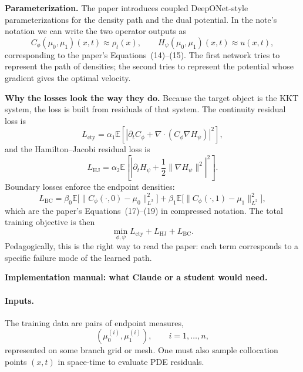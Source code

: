\documentclass[11pt]{report}
\newcommand{\E}{\mathbb{E}}
\begin{document}
\textbf{Parameterization.}
The paper introduces coupled DeepONet-style parameterizations for the density path
and the dual potential.  In the note's notation we can write the two operator
outputs as
\begin{equation}
C_\phi(\mu_0,\mu_1)(x,t)
\approx \rho_t(x),
\qquad
H_\psi(\mu_0,\mu_1)(x,t)
\approx u(x,t),
\label{eq:geonet-two-outputs}
\end{equation}
corresponding to the paper's Equations~(14)--(15).  The first network tries to
represent the path of densities; the second tries to represent the potential whose
gradient gives the optimal velocity.

\textbf{Why the losses look the way they do.}
Because the target object is the KKT system, the loss is built from residuals of
that system.  The continuity residual loss is
\begin{equation}
L_{\mathrm{cty}}
=
\alpha_1\E\left[\left|\partial_t C_\phi + \nabla\cdot(C_\phi\nabla H_\psi)\right|^2\right],
\label{eq:geonet-lcty}
\end{equation}
and the Hamilton--Jacobi residual loss is
\begin{equation}
L_{\mathrm{HJ}}
=
\alpha_2\E\left[\left|\partial_t H_\psi + \frac12\|\nabla H_\psi\|^2\right|^2\right].
\label{eq:geonet-lhj}
\end{equation}
Boundary losses enforce the endpoint densities:
\begin{equation}
L_{\mathrm{BC}}
=
\beta_0\E\bigl[\|C_\phi(\cdot,0)-\mu_0\|_{L^2}^2\bigr]
+
\beta_1\E\bigl[\|C_\phi(\cdot,1)-\mu_1\|_{L^2}^2\bigr],
\label{eq:geonet-lbc}
\end{equation}
which are the paper's Equations~(17)--(19) in compressed notation.  The total
training objective is then
\begin{equation}
\min_{\phi,\psi} L_{\mathrm{cty}}+L_{\mathrm{HJ}}+L_{\mathrm{BC}}.
\label{eq:geonet-total-loss}
\end{equation}
Pedagogically, this is the right way to read the paper: each term corresponds to a
specific failure mode of the learned path.

\textbf{Implementation manual: what Claude or a student would need.}

\paragraph{Inputs.}
The training data are pairs of endpoint measures,
\begin{equation}
(\mu_0^{(i)},\mu_1^{(i)}),
\qquad i=1,\ldots,n,
\label{eq:geonet-endpoint-dataset}
\end{equation}
represented on some branch grid or mesh.  One must also sample collocation points
$(x,t)$ in space-time to evaluate PDE residuals.
\end{document}
